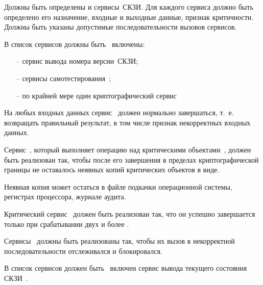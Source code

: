 \label{R.SV.List}
Должны быть определены и   
сервисы~СКЗИ.
%
Для каждого сервиса должно быть определено его назначение, 
входные и выходные данные, признак критичности.
%
Должны быть указаны допустимые последовательности вызовов сервисов.
%

\label{R.SV.Oblig}
В список сервисов должны быть~ включены:
\begin{itemize}
\item[--]
сервис вывода номера версии~СКЗИ;
\item[--]
сервисы самотестирования~;
\item[--]
по крайней мере один криптографический сервис
\end{itemize}

\label{R.SV.Robust}
На любых входных данных сервис~ должен нормально 
завершаться, т.~е. возвращать правильный результат,  
в том числе признак некорректных входных данных.

\label{R.SV.Leaks}
Сервис~, который выполняет операцию над критическими
объектами~, должен быть реализован так, чтобы после его
завершения в пределах криптографической границы не оставалось 
неявных копий критических объектов в  виде.

\begin{note*}
Неявная копия может остаться в файле подкачки операционной системы, 
регистрах процессора, журнале аудита. 
\end{note*}

\label{R.SV.Crit}
Критический сервис~ должен быть реализован так,
что он успешно завершается только при срабатывании двух и более 
.

\label{R.SV.Seq}
Сервисы~ должны быть реализованы так, чтобы их вызов в
некорректной последовательности отслеживался и блокировался.

\label{R.SV.Status}
В список сервисов должен быть~ включен
сервис вывода текущего состояния СКЗИ~.

